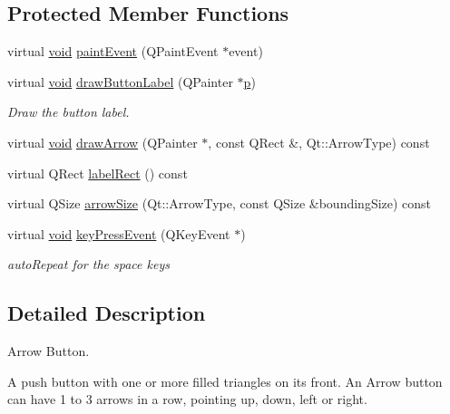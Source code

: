\subsection*{Protected Member Functions}
\begin{DoxyCompactItemize}
\item 
virtual \hyperlink{group___u_a_v_objects_plugin_ga444cf2ff3f0ecbe028adce838d373f5c}{void} \hyperlink{class_qwt_arrow_button_ad9bdd4ed2e655aa19929ab436ec8ab45}{paint\-Event} (Q\-Paint\-Event $\ast$event)
\item 
virtual \hyperlink{group___u_a_v_objects_plugin_ga444cf2ff3f0ecbe028adce838d373f5c}{void} \hyperlink{class_qwt_arrow_button_afc342cb3eaa01afe5aa897b3fd6aa7c2}{draw\-Button\-Label} (Q\-Painter $\ast$\hyperlink{glext_8h_aa5367c14d90f462230c2611b81b41d23}{p})
\begin{DoxyCompactList}\small\item\em Draw the button label. \end{DoxyCompactList}\item 
virtual \hyperlink{group___u_a_v_objects_plugin_ga444cf2ff3f0ecbe028adce838d373f5c}{void} \hyperlink{class_qwt_arrow_button_aba724cf7e2f7e640b2e4f5c08f37d125}{draw\-Arrow} (Q\-Painter $\ast$, const Q\-Rect \&, Qt\-::\-Arrow\-Type) const 
\item 
virtual Q\-Rect \hyperlink{class_qwt_arrow_button_ae32f665bfa6ab478e4ba7fd068bb3088}{label\-Rect} () const 
\item 
virtual Q\-Size \hyperlink{class_qwt_arrow_button_a544fc12a1756eb2b703ab9a2903240cb}{arrow\-Size} (Qt\-::\-Arrow\-Type, const Q\-Size \&bounding\-Size) const 
\item 
virtual \hyperlink{group___u_a_v_objects_plugin_ga444cf2ff3f0ecbe028adce838d373f5c}{void} \hyperlink{class_qwt_arrow_button_a17612daa99344272c4de1313a5c67b02}{key\-Press\-Event} (Q\-Key\-Event $\ast$)
\begin{DoxyCompactList}\small\item\em auto\-Repeat for the space keys \end{DoxyCompactList}\end{DoxyCompactItemize}


\subsection{Detailed Description}
Arrow Button. 

A push button with one or more filled triangles on its front. An Arrow button can have 1 to 3 arrows in a row, pointing up, down, left or right. 

